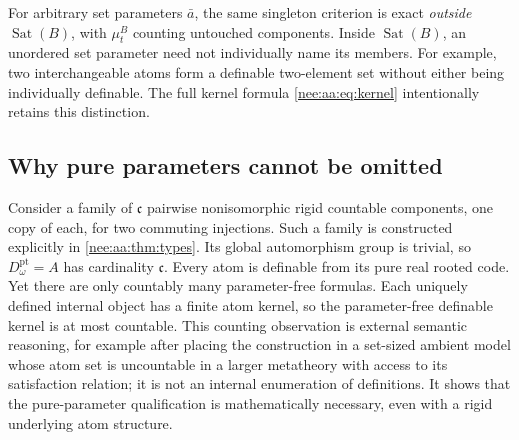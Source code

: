\documentclass[11pt,letterpaper]{article}
\numberwithin{equation}{section}
\theoremstyle{plain}
\theoremstyle{definition}
\theoremstyle{remark}
\newcommand{\cont}{\mathfrak c}
\newcommand{\Sat}{\operatorname{Sat}}
\begin{document}
For arbitrary set parameters $\bar a$, the same singleton criterion is exact
\emph{outside} $\Sat(B)$, with $\mu_t^B$ counting untouched components. Inside
$\Sat(B)$, an unordered set parameter need not individually name its members.
For example, two interchangeable atoms form a definable two-element set without
either being individually definable. The full kernel formula
\eqref{nee:aa:eq:kernel} intentionally retains this distinction.

\subsection{Why pure parameters cannot be omitted}\label{nee:aa:sec:pureparams}

Consider a family of $\cont$ pairwise nonisomorphic rigid countable components,
one copy of each, for two commuting injections. Such a family is constructed
explicitly in \cref{nee:aa:thm:types}. Its global automorphism group is trivial, so
$D^{\mathrm{pt}}_\omega=A$ has cardinality $\cont$. Every atom is definable from
its pure real rooted code. Yet there are only countably many parameter-free
formulas. Each uniquely defined internal object has a finite atom kernel, so
the parameter-free definable kernel is at most countable. This counting
observation is external semantic reasoning, for example after placing the
construction in a set-sized ambient model whose atom set is uncountable in
a larger metatheory with access to its satisfaction relation; it is not an
internal enumeration of definitions.
It shows that the
pure-parameter qualification is mathematically necessary, even with a rigid
underlying atom structure.
\end{document}
